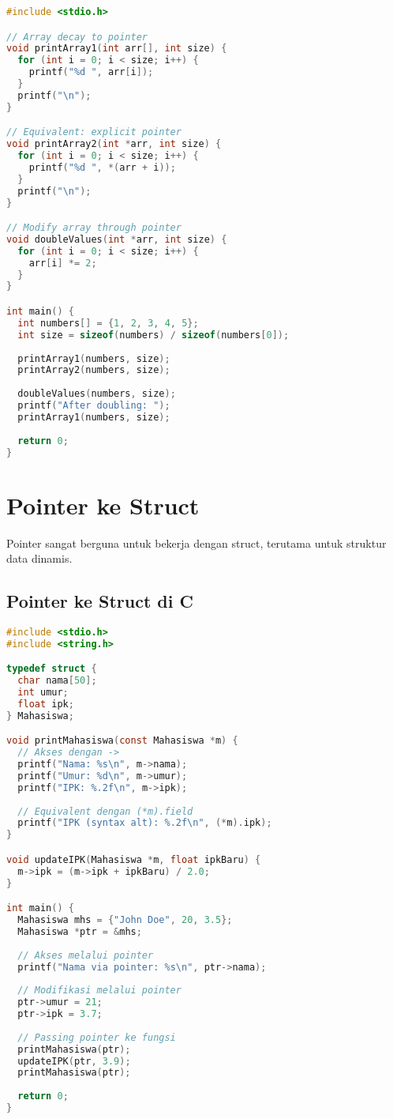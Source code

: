 \documentclass[../main.tex]{subfiles}
\begin{document}
\begin{lstlisting}[language=C, caption={Array sebagai parameter fungsi}]
#include <stdio.h>

// Array decay to pointer
void printArray1(int arr[], int size) {
  for (int i = 0; i < size; i++) {
    printf("%d ", arr[i]);
  }
  printf("\n");
}

// Equivalent: explicit pointer
void printArray2(int *arr, int size) {
  for (int i = 0; i < size; i++) {
    printf("%d ", *(arr + i));
  }
  printf("\n");
}

// Modify array through pointer
void doubleValues(int *arr, int size) {
  for (int i = 0; i < size; i++) {
    arr[i] *= 2;
  }
}

int main() {
  int numbers[] = {1, 2, 3, 4, 5};
  int size = sizeof(numbers) / sizeof(numbers[0]);
  
  printArray1(numbers, size);
  printArray2(numbers, size);
  
  doubleValues(numbers, size);
  printf("After doubling: ");
  printArray1(numbers, size);
  
  return 0;
}
\end{lstlisting}

\section{Pointer ke Struct}

Pointer sangat berguna untuk bekerja dengan struct, terutama untuk struktur data dinamis.

\subsection{Pointer ke Struct di C}

\begin{lstlisting}[language=C, caption={Pointer to struct di C}]
#include <stdio.h>
#include <string.h>

typedef struct {
  char nama[50];
  int umur;
  float ipk;
} Mahasiswa;

void printMahasiswa(const Mahasiswa *m) {
  // Akses dengan ->
  printf("Nama: %s\n", m->nama);
  printf("Umur: %d\n", m->umur);
  printf("IPK: %.2f\n", m->ipk);
  
  // Equivalent dengan (*m).field
  printf("IPK (syntax alt): %.2f\n", (*m).ipk);
}

void updateIPK(Mahasiswa *m, float ipkBaru) {
  m->ipk = (m->ipk + ipkBaru) / 2.0;
}

int main() {
  Mahasiswa mhs = {"John Doe", 20, 3.5};
  Mahasiswa *ptr = &mhs;
  
  // Akses melalui pointer
  printf("Nama via pointer: %s\n", ptr->nama);
  
  // Modifikasi melalui pointer
  ptr->umur = 21;
  ptr->ipk = 3.7;
  
  // Passing pointer ke fungsi
  printMahasiswa(ptr);
  updateIPK(ptr, 3.9);
  printMahasiswa(ptr);
  
  return 0;
}
\end{lstlisting}
\end{document}
